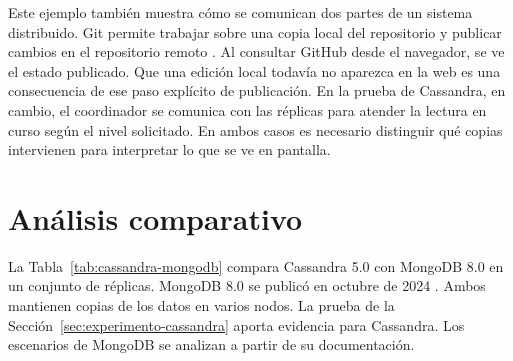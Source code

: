 \documentclass[11pt,a4paper]{article}
\begin{document}
Este ejemplo también muestra cómo se comunican dos partes de un sistema distribuido. Git permite trabajar sobre una copia local del repositorio y publicar cambios en el repositorio remoto \cite{githubCloningRepo}. Al consultar GitHub desde el navegador, se ve el estado publicado. Que una edición local todavía no aparezca en la web es una consecuencia de ese paso explícito de publicación. En la prueba de Cassandra, en cambio, el coordinador se comunica con las réplicas para atender la lectura en curso según el nivel solicitado. En ambos casos es necesario distinguir qué copias intervienen para interpretar lo que se ve en pantalla.

\section{Análisis comparativo}
La Tabla~\ref{tab:cassandra-mongodb} compara Cassandra 5.0 con MongoDB 8.0 en un conjunto de réplicas. MongoDB 8.0 se publicó en octubre de 2024 \cite{mongodb2024release}. Ambos mantienen copias de los datos en varios nodos. La prueba de la Sección~\ref{sec:experimento-cassandra} aporta evidencia para Cassandra. Los escenarios de MongoDB se analizan a partir de su documentación.
\end{document}
